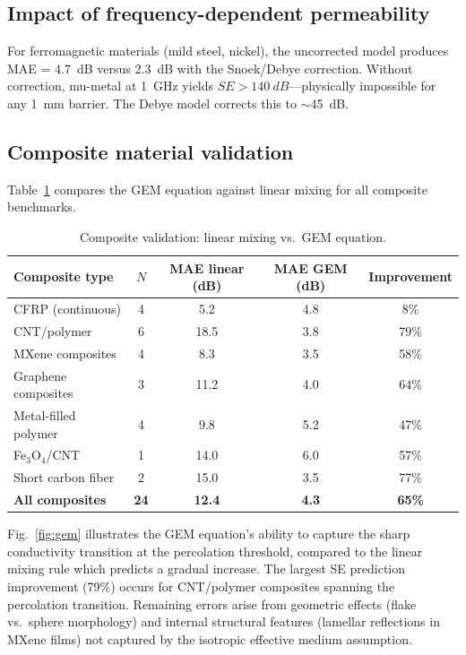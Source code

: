 \documentclass[review,3p,authoryear]{elsarticle}
\begin{document}
\subsection{Impact of frequency-dependent permeability}

For ferromagnetic materials (mild steel, nickel), the uncorrected model produces MAE = \SI{4.7}{dB} versus \SI{2.3}{dB} with the Snoek/Debye correction. Without correction, mu-metal at \SI{1}{GHz} yields $SE > \SI{140}{dB}$---physically impossible for any \SI{1}{mm} barrier. The Debye model corrects this to $\sim$\SI{45}{dB}.

\subsection{Composite material validation}

Table~\ref{tab:composites} compares the GEM equation against linear mixing for all composite benchmarks.

\begin{table}[htbp]
\centering
\caption{Composite validation: linear mixing vs.\ GEM equation.}
\label{tab:composites}
\begin{tabular}{@{}lcccc@{}}
\toprule
Composite type & $N$ & MAE linear (dB) & MAE GEM (dB) & Improvement \\
\midrule
CFRP (continuous)    & 4 & 5.2  & 4.8 & 8\% \\
CNT/polymer          & 6 & 18.5 & 3.8 & 79\% \\
MXene composites     & 4 & 8.3  & 3.5 & 58\% \\
Graphene composites  & 3 & 11.2 & 4.0 & 64\% \\
Metal-filled polymer & 4 & 9.8  & 5.2 & 47\% \\
Fe$_3$O$_4$/CNT      & 1 & 14.0 & 6.0 & 57\% \\
Short carbon fiber   & 2 & 15.0 & 3.5 & 77\% \\
\midrule
\textbf{All composites} & \textbf{24} & \textbf{12.4} & \textbf{4.3} & \textbf{65\%} \\
\bottomrule
\end{tabular}
\end{table}

Fig.~\ref{fig:gem} illustrates the GEM equation's ability to capture the sharp conductivity transition at the percolation threshold, compared to the linear mixing rule which predicts a gradual increase. The largest SE prediction improvement (79\%) occurs for CNT/polymer composites spanning the percolation transition. Remaining errors arise from geometric effects (flake vs.\ sphere morphology) and internal structural features (lamellar reflections in MXene films) not captured by the isotropic effective medium assumption.
\end{document}
